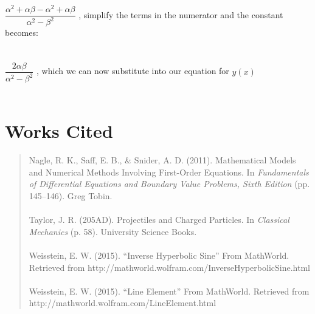 \documentclass[12pt]{article}
\begin{document}
	\\
	\\
	\\
	$\dfrac{\alpha^2 +\alpha\beta-\alpha^2 +\alpha\beta}{\alpha^2-\beta^2}$ \hspace{1.3cm} , simplify the terms in the numerator and the constant becomes:
	\\
	\\
	\\
	$\dfrac{2\alpha\beta}{\alpha^2-\beta^2}$  \hspace{3.4cm} , which we can now substitute into our equation for $y(x)$
	\\
	\\
	
	\clearpage
	
	\section{Works Cited}
	
	\begin{quote}
		Nagle, R. K., Saff, E. B., \& Snider, A. D. (2011). Mathematical Models and Numerical Methods Involving First-Order Equations. In \textit{Fundamentals of Differential Equations and 
		Boundary Value Problems, Sixth Edition} (pp. 145–146). Greg Tobin.
	\\
	\\
		Taylor, J. R. (205AD). Projectiles and Charged Particles. In \textit{Classical Mechanics} (p. 58). University Science Books.
	\\
	\\
		Weisstein, E. W. (2015). “Inverse Hyperbolic Sine” From MathWorld. Retrieved from http://mathworld.wolfram.com/InverseHyperbolicSine.html
	\\
	\\
		Weisstein, E. W. (2015). “Line Element” From MathWorld. Retrieved from 
		\\http://mathworld.wolfram.com/LineElement.html
	\end{quote}
	

	

	
	
\end{document}
